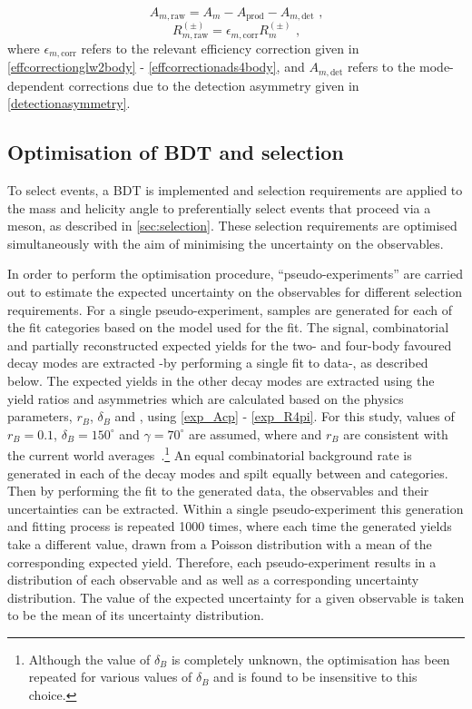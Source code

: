 \begin{equation}
A_{m, \text{raw}} = A_m - A_{\text{prod}} - A_{m, \text{det}} \text{ ,}
\end{equation}
\begin{equation}
R_{m, \text{raw}}^{(\pm)} = \epsilon_{m, \text{corr}}R_m^{(\pm)} \text{ ,}
\end{equation}
where $\epsilon_{m, \text{corr}}$ refers to the relevant efficiency correction given in \eqns\ref{effcorrectionglw2body} - \ref{effcorrectionads4body}, and $A_{m, \text{det}}$ refers to the mode-dependent corrections due to the detection asymmetry given in \tab\ref{detectionasymmetry}.

\subsection{Optimisation of BDT and \Kstar selection}
\label{sec:cpfit:optimisation}

To select \btodkst events, a BDT is implemented and selection requirements are applied to the \Kstarm mass and \KS helicity angle to preferentially select events that proceed via a \Kstarm meson, as described in \sect\ref{sec:selection}. These selection requirements are optimised simultaneously with the aim of minimising the uncertainty on the \CP observables. 

In order to perform the optimisation procedure, ``pseudo-experiments'' are carried out to estimate the expected uncertainty on the \CP observables for different selection requirements. For a single pseudo-experiment, samples are generated for each of the \CP fit categories based on the model used for the \CP fit. The signal, combinatorial and partially reconstructed expected yields for the two- and four-body favoured \Dz decay modes are extracted -by performing a single fit to data-, as described below. The expected yields in the other \Dz decay modes are extracted using the yield ratios and asymmetries which are calculated based on the physics parameters, $r_B$, $\delta_B$ and \Pgamma, using \eqns\ref{exp_Acp} - \ref{exp_R4pi}. For this study, values of $r_B = 0.1$, $\delta_B = 150^{\circ}$ and $\gamma = 70^{\circ}$ are assumed, where \Pgamma and $r_B$ are consistent with the current world averages~\cite{CKMFitter}.\footnote{Although the value of $\delta_B$ is completely unknown, the optimisation has been repeated for various values of $\delta_B$ and is found to be insensitive to this choice.}  An equal combinatorial background rate is generated in each of the \Dz decay modes and spilt equally between \Bm and \Bp categories. Then by performing the \CP fit to the generated data, the \CP observables and their uncertainties can be extracted. Within a single pseudo-experiment this generation and fitting process is repeated 1000 times, where each time the generated yields take a different value, drawn from a Poisson distribution with a mean of the corresponding expected yield. Therefore, each pseudo-experiment results in a distribution of each \CP observable and as well as a corresponding uncertainty distribution. The value of the expected uncertainty for a given \CP observable is taken to be the mean of its uncertainty distribution.


